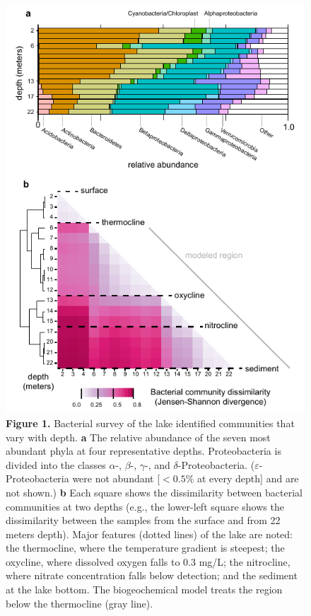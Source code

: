 \begin{figure}[ht]
\centering
\includegraphics{lake/fig/fig1}
\caption*{{\bf Figure 1.} Bacterial survey of the lake identified communities
that vary with depth. {\bf a} The relative abundance of the seven most abundant phyla
at four representative depths. Proteobacteria is divided into the classes $\alpha$-,
$\beta$-, $\gamma$-, and $\delta$-Proteobacteria. ($\varepsilon$-Proteobacteria were 
not abundant [$< 0.5\%$ at
every depth] and are not shown.) {\bf b} Each square shows the dissimilarity between
bacterial communities at two depths (e.g., the lower-left square shows the
dissimilarity between the samples from the surface and from 22 meters depth).
Major features (dotted lines) of the lake are noted: the thermocline, where the
temperature gradient is steepest; the oxycline, where dissolved oxygen falls to
0.3 mg/L; the nitrocline, where nitrate concentration falls below detection;
and the sediment at the lake bottom. The biogeochemical model treats the region
below the thermocline (gray line).}
\end{figure}

